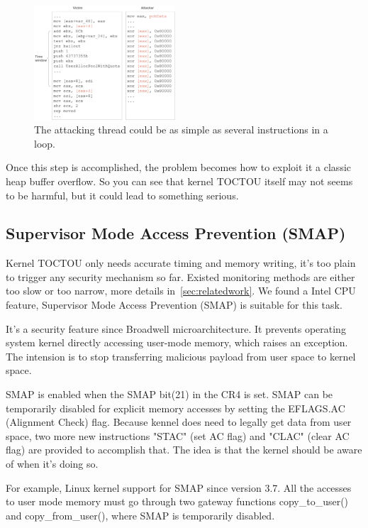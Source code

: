 \begin{figure}[h]
  \includegraphics[width=0.47\textwidth]{figures/toctouasm}
  \centering
  \caption{The attacking thread could be as simple as several instructions in a loop.}
  \label{fig:toctouasm}
\end{figure}


Once this step is accomplished, the problem becomes how to exploit it a classic heap buffer overflow. So you can see that kernel TOCTOU itself may not seems to be harmful, but it could lead to something serious. 

\subsection{Supervisor Mode Access Prevention (SMAP)}
Kernel TOCTOU only needs accurate timing and memory writing, it's too plain to trigger any security mechanism so far. Existed monitoring methods are either too slow or too narrow, more details in~\autoref{sec:relatedwork}. We found a Intel CPU feature, Supervisor Mode Access Prevention (SMAP) is suitable for this task. 

It's a security feature since Broadwell microarchitecture. It prevents operating system kernel directly accessing user-mode memory, which raises an exception. The intension is to stop transferring malicious payload from user space to kernel space.

SMAP is enabled when the SMAP bit(21) in the CR4 is set. SMAP can be temporarily disabled for explicit memory accesses by setting the EFLAGS.AC (Alignment Check) flag. Because kennel does need to legally get data from user space, two more new instructions "STAC" (set AC flag) and "CLAC" (clear AC flag) are provided to accomplish that. The idea is that the kernel should be aware of when it's doing so. 

For example, Linux kernel support for SMAP since version 3.7. All the accesses to user mode memory must go through two gateway functions copy\_to\_user() and copy\_from\_user(), where SMAP is temporarily disabled.

